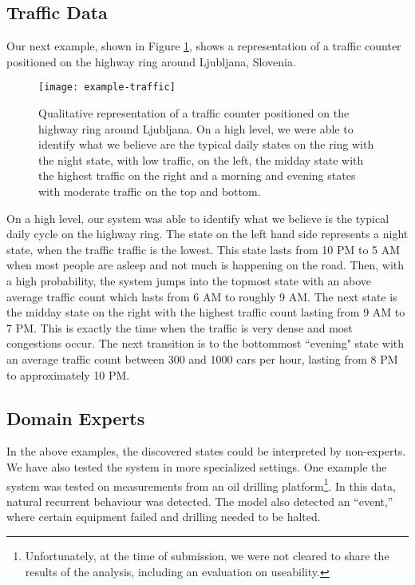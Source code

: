 \subsection{Traffic Data}

Our next example, shown in Figure \ref{fig:example-traffic}, shows a representation of a traffic counter positioned on the highway ring around Ljubljana, Slovenia.
\begin{figure}[h!]
	\centering
	\texttt{[image: example-traffic]}
	\caption{Qualitative representation of a traffic counter positioned on the highway ring around Ljubljana. On a high level, we were able to identify what we believe are the typical daily states on the ring with the night state, with low traffic, on the left, the midday state with the highest traffic on the right and a morning and evening states with moderate traffic on the top and bottom. }
	\label{fig:example-traffic}
\end{figure}
On a high level, our system was able to identify what we believe is the typical daily cycle on the highway ring.
The state on the left hand side represents a night state, when the traffic traffic is the lowest. This state
lasts from 10 PM to 5 AM when most people are asleep and not much is happening on the road. Then, with a high 
probability, the system jumps into the topmost state with an above average traffic count which lasts from 6 AM
to roughly 9 AM. The next state is the midday state on the right with the highest traffic count lasting from 9 AM
to 7 PM. This is exactly the time when the traffic is very dense and most congestions occur. The next transition
is to the bottommost ``evening" state with an average traffic count between 300 and 1000 cars per hour,
lasting from 8 PM to approximately 10 PM. 


\subsection{Domain Experts}
In the above examples, the discovered states could be interpreted by non-experts. We have also tested the system in more specialized settings. One example the system was tested on measurements from an oil drilling platform\footnote{Unfortunately, at the time of submission, we were not cleared to share the results of the analysis, including an evaluation on useability.}. In this data, natural recurrent behaviour was detected.  The model also detected an ``event,'' where certain equipment failed and drilling needed to be halted.  



